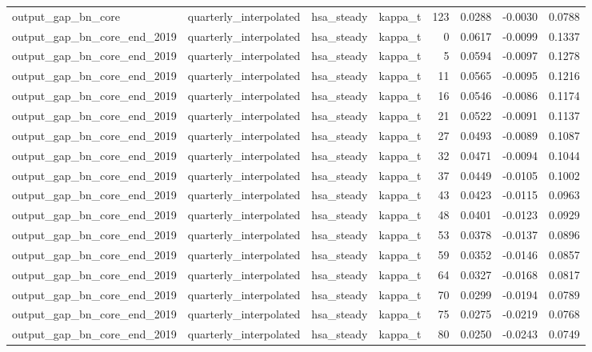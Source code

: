 \begin{tabular}{llllrrrr}
output\_gap\_bn\_core & quarterly\_interpolated & hsa\_steady & kappa\_t & 123 & 0.0288 & -0.0030 & 0.0788 \\
output\_gap\_bn\_core\_end\_2019 & quarterly\_interpolated & hsa\_steady & kappa\_t & 0 & 0.0617 & -0.0099 & 0.1337 \\
output\_gap\_bn\_core\_end\_2019 & quarterly\_interpolated & hsa\_steady & kappa\_t & 5 & 0.0594 & -0.0097 & 0.1278 \\
output\_gap\_bn\_core\_end\_2019 & quarterly\_interpolated & hsa\_steady & kappa\_t & 11 & 0.0565 & -0.0095 & 0.1216 \\
output\_gap\_bn\_core\_end\_2019 & quarterly\_interpolated & hsa\_steady & kappa\_t & 16 & 0.0546 & -0.0086 & 0.1174 \\
output\_gap\_bn\_core\_end\_2019 & quarterly\_interpolated & hsa\_steady & kappa\_t & 21 & 0.0522 & -0.0091 & 0.1137 \\
output\_gap\_bn\_core\_end\_2019 & quarterly\_interpolated & hsa\_steady & kappa\_t & 27 & 0.0493 & -0.0089 & 0.1087 \\
output\_gap\_bn\_core\_end\_2019 & quarterly\_interpolated & hsa\_steady & kappa\_t & 32 & 0.0471 & -0.0094 & 0.1044 \\
output\_gap\_bn\_core\_end\_2019 & quarterly\_interpolated & hsa\_steady & kappa\_t & 37 & 0.0449 & -0.0105 & 0.1002 \\
output\_gap\_bn\_core\_end\_2019 & quarterly\_interpolated & hsa\_steady & kappa\_t & 43 & 0.0423 & -0.0115 & 0.0963 \\
output\_gap\_bn\_core\_end\_2019 & quarterly\_interpolated & hsa\_steady & kappa\_t & 48 & 0.0401 & -0.0123 & 0.0929 \\
output\_gap\_bn\_core\_end\_2019 & quarterly\_interpolated & hsa\_steady & kappa\_t & 53 & 0.0378 & -0.0137 & 0.0896 \\
output\_gap\_bn\_core\_end\_2019 & quarterly\_interpolated & hsa\_steady & kappa\_t & 59 & 0.0352 & -0.0146 & 0.0857 \\
output\_gap\_bn\_core\_end\_2019 & quarterly\_interpolated & hsa\_steady & kappa\_t & 64 & 0.0327 & -0.0168 & 0.0817 \\
output\_gap\_bn\_core\_end\_2019 & quarterly\_interpolated & hsa\_steady & kappa\_t & 70 & 0.0299 & -0.0194 & 0.0789 \\
output\_gap\_bn\_core\_end\_2019 & quarterly\_interpolated & hsa\_steady & kappa\_t & 75 & 0.0275 & -0.0219 & 0.0768 \\
output\_gap\_bn\_core\_end\_2019 & quarterly\_interpolated & hsa\_steady & kappa\_t & 80 & 0.0250 & -0.0243 & 0.0749 \\

\end{tabular}
